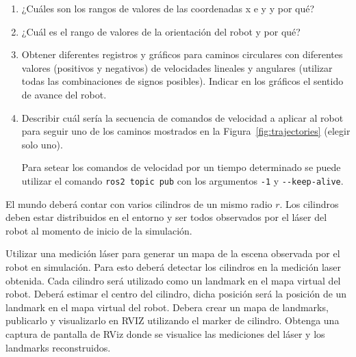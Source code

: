 \documentclass[tp]{lcc}
\begin{document}
	\begin{enumerate}
		
		\item ¿Cuáles son los rangos de valores de las coordenadas x e y y por qué?
		
		\item  ¿Cuál es el rango de valores de la orientación del robot y por qué?
		
		\item Obtener diferentes registros y gráficos para caminos circulares con diferentes valores (positivos y negativos) de velocidades lineales y angulares (utilizar todas las combinaciones de signos posibles). Indicar en los gráficos el sentido de avance del robot.
		
		\item Describir cuál sería la secuencia de comandos de velocidad a aplicar al robot para seguir uno de los caminos mostrados en la Figura~\ref{fig:trajectories} (elegir solo uno).
		
		\begin{nota}
			Para setear los comandos de velocidad por un tiempo determinado se puede utilizar el comando \lstinline[style=bash]{ros2 topic pub} con los argumentos \lstinline[style=bash]{-1} y \lstinline[style=bash]{--keep-alive}.
		\end{nota}
		
	\end{enumerate}
	

	\ejercicio El mundo deberá contar con varios cilindros de un mismo radio $r$. Los cilindros deben estar distribuidos en el entorno y ser todos observados por el láser del robot al momento de inicio de la simulación.
	
	Utilizar una medición láser para generar un mapa de la escena observada por el robot en simulación. Para esto deberá detectar los cilindros en la medición laser obtenida. Cada cilindro será utilizado como un landmark en el mapa virtual del robot. Deberá estimar el centro del cilindro, dicha posición será la posición de un landmark en el mapa virtual del robot. Debera crear un mapa de landmarks, publicarlo y visualizarlo en RVIZ utilizando el marker de cilindro.
	Obtenga una captura de pantalla de RViz donde se visualice las mediciones del láser y los landmarks reconstruidos.
	
	
	\printbibliography
	
\end{document}
